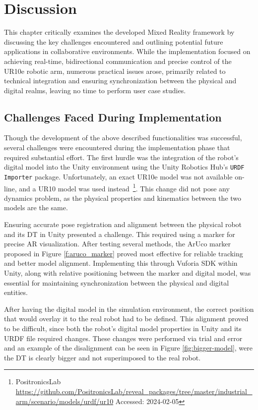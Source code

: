 \chapter{Discussion}

\begin{introduction}
    This chapter critically examines the developed Mixed Reality framework by discussing the key challenges encountered and outlining potential future applications in collaborative environments. While the implementation focused on achieving real-time, bidirectional communication and precise control of the UR10e robotic arm, numerous practical issues arose, primarily related to technical integration and ensuring synchronization between the physical and digital realms, leaving no time to perform user case studies.
\end{introduction}


\section{Challenges Faced During Implementation}
Though the development of the above described functionalities was successful, several challenges were encountered during the implementation phase that required substantial effort. The first hurdle was the integration of the robot’s digital model into the Unity environment using the Unity Robotics Hub's \texttt{URDF Importer} package. Unfortunately, an exact UR10e model was not available on-line, and a UR10 model was used instead~\footnote{PositronicsLab \url{https://github.com/PositronicsLab/reveal_packages/tree/master/industrial_arm/scenario/models/urdf/ur10} Accessed: 2024-02-05}. This change did not pose any dynamics problem, as the physical properties and kinematics between the two models are the same.

Ensuring accurate pose registration and alignment between the physical robot and its \ac{DT} in Unity presented a challenge. This required using a marker for precise \ac{AR} visualization. After testing several methods, the ArUco marker proposed in Figure \ref{f:aruco_marker} proved most effective for reliable tracking and better model alignment. Implementing this through Vuforia \ac{SDK} within Unity, along with relative positioning between the marker and digital model, was essential for maintaining synchronization between the physical and digital entities.

After having the digital model in the simulation environment, the correct position that would overlay it to the real robot had to be defined. This alignment proved to be difficult, since both the robot's digital model properties in Unity and its \ac{URDF} file required changes. These changes were performed via trial and error and an example of the disalignment can be seen in Figure \ref{fig:bigger-model}, were the \ac{DT} is clearly bigger and not superimposed to the real robot.

